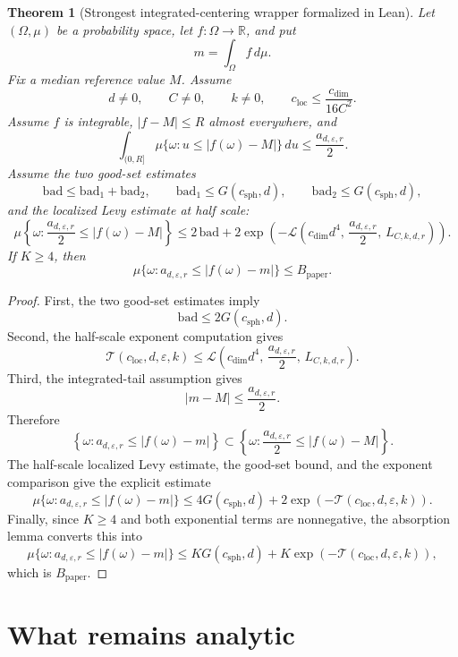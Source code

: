 \documentclass[11pt]{article}
\newtheorem{theorem}{Theorem}[section]
\newcommand{\R}{\mathbb{R}}
\begin{document}
\begin{theorem}[Strongest integrated-centering wrapper formalized in Lean]
Let \((\Omega,\mu)\) be a probability space, let \(f:\Omega\to\R\), and put
\[
 m=\int_\Omega f\,d\mu.
\]
Fix a median reference value \(M\).  Assume
\[
 d\ne0,\qquad C\ne0,\qquad k\ne0,\qquad
 c_{\mathrm{loc}}\le \frac{c_{\mathrm{dim}}}{16C^2}.
\]
Assume \(f\) is integrable, \(|f-M|\le R\) almost everywhere, and
\[
 \int_{(0,R]}
   \mu\{\omega:u\le |f(\omega)-M|\}\,du
 \le
 \frac{a_{d,\varepsilon,r}}{2}.
\]
Assume the two good-set estimates
\[
 \mathrm{bad}\le \mathrm{bad}_1+\mathrm{bad}_2,\qquad
 \mathrm{bad}_1\le G(c_{\mathrm{sph}},d),\qquad
 \mathrm{bad}_2\le G(c_{\mathrm{sph}},d),
\]
and the localized Levy estimate at half scale:
\[
 \mu\left\{\omega:
   \frac{a_{d,\varepsilon,r}}{2}\le |f(\omega)-M|
 \right\}
 \le
 2\,\mathrm{bad}
 +2\exp\!\left(
   -\mathcal L\left(
       c_{\mathrm{dim}}d^4,\,
       \frac{a_{d,\varepsilon,r}}{2},\,
       L_{C,k,d,r}
     \right)
 \right).
\]
If \(K\ge4\), then
\[
 \mu\{\omega:a_{d,\varepsilon,r}\le |f(\omega)-m|\}
 \le
 B_{\mathrm{paper}}.
\]
\end{theorem}

\begin{proof}
First, the two good-set estimates imply
\[
  \mathrm{bad}\le 2G(c_{\mathrm{sph}},d).
\]
Second, the half-scale exponent computation gives
\[
 \mathcal T(c_{\mathrm{loc}},d,\varepsilon,k)
 \le
 \mathcal L\left(
       c_{\mathrm{dim}}d^4,\,
       \frac{a_{d,\varepsilon,r}}{2},\,
       L_{C,k,d,r}
     \right).
\]
Third, the integrated-tail assumption gives
\[
 |m-M|\le \frac{a_{d,\varepsilon,r}}{2}.
\]
Therefore
\[
 \left\{\omega:a_{d,\varepsilon,r}\le |f(\omega)-m|\right\}
 \subset
 \left\{\omega:\frac{a_{d,\varepsilon,r}}{2}\le |f(\omega)-M|\right\}.
\]
The half-scale localized Levy estimate, the good-set bound, and the exponent
comparison give the explicit estimate
\[
 \mu\{\omega:a_{d,\varepsilon,r}\le |f(\omega)-m|\}
 \le
 4G(c_{\mathrm{sph}},d)
 +2\exp(-\mathcal T(c_{\mathrm{loc}},d,\varepsilon,k)).
\]
Finally, since \(K\ge4\) and both exponential terms are nonnegative, the
absorption lemma converts this into
\[
 \mu\{\omega:a_{d,\varepsilon,r}\le |f(\omega)-m|\}
 \le
 K G(c_{\mathrm{sph}},d)
 +K\exp(-\mathcal T(c_{\mathrm{loc}},d,\varepsilon,k)),
\]
which is \(B_{\mathrm{paper}}\).
\end{proof}

\section*{What remains analytic}
\end{document}
